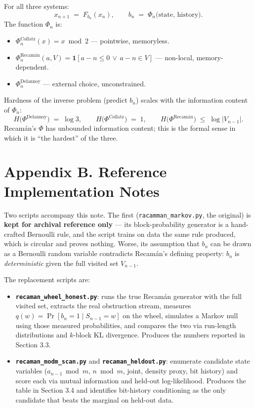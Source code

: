 \documentclass[
  11pt,
]{article}
\providecommand{\tightlist}{%
  \setlength{\itemsep}{0pt}\setlength{\parskip}{0pt}}
\begin{document}
For all three systems: \[
\boxed{\; x_{n+1} \;=\; F_{b_n}(x_n), \qquad b_n \;=\; \Phi_n\bigl(\text{state},\,\text{history}\bigr). \;}
\] The function \(\Phi_n\) is:

\begin{itemize}
\tightlist
\item
  \(\Phi_n^{\text{Collatz}}(x) = x \bmod 2\) --- pointwise, memoryless.
\item
  \(\Phi_n^{\text{Recamán}}(a, V) = \mathbf{1}[a - n \le 0 \,\lor\, a - n \in V]\)
  --- non-local, memory-dependent.
\item
  \(\Phi_n^{\text{Delannoy}}\) --- external choice, unconstrained.
\end{itemize}

Hardness of the inverse problem (predict \(b_n\)) scales with the
information content of \(\Phi_n\): \[
H\bigl(\Phi^{\text{Delannoy}}\bigr) \;=\; \log 3, \qquad
H\bigl(\Phi^{\text{Collatz}}\bigr) \;=\; 1, \qquad
H\bigl(\Phi^{\text{Recamán}}\bigr) \;\le\; \log |V_{n-1}|.
\] Recamán's \(\Phi\) has unbounded information content; this is the
formal sense in which it is ``the hardest'' of the three.

\hypertarget{appendix-b.-reference-implementation-notes}{%
\section{Appendix B. Reference Implementation
Notes}\label{appendix-b.-reference-implementation-notes}}

Two scripts accompany this note. The first
(\texttt{racamman\_markov.py}, the original) is \textbf{kept for
archival reference only} --- its block-probability generator is a
hand-crafted Bernoulli rule, and the script trains on data the same rule
produced, which is circular and proves nothing. Worse, its assumption
that \(b_n\) can be drawn as a Bernoulli random variable contradicts
Recamán's defining property: \(b_n\) is \emph{deterministic} given the
full visited set \(V_{n-1}\).

The replacement scripts are:

\begin{itemize}
\item
  \textbf{\texttt{recaman\_wheel\_honest.py}}: runs the true Recamán
  generator with the full visited set, extracts the real obstruction
  stream, measures \(q(w) = \Pr[b_n = 1 \mid S_{n-1} = w]\) on the
  wheel, simulates a Markov null using those measured probabilities, and
  compares the two via run-length distributions and \(k\)-block KL
  divergence. Produces the numbers reported in Section 3.3.
\item
  \textbf{\texttt{recaman\_modm\_scan.py}} and
  \textbf{\texttt{recaman\_heldout.py}}: enumerate candidate state
  variables (\(a_{n-1} \bmod m\), \(n \bmod m\), joint, density proxy,
  bit history) and score each via mutual information and held-out
  log-likelihood. Produces the table in Section 3.4 and identifies
  bit-history conditioning as the only candidate that beats the marginal
  on held-out data.
\end{itemize}
\end{document}
